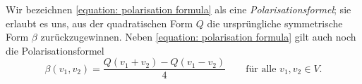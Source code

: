 Wir bezeichnen \eqref{equation: polarisation formula} als eine \emph{Polarisationsformel};
sie erlaubt es uns, aus der quadratischen Form $Q$ die ursprüngliche symmetrische Form $\beta$ zurückzugewinnen.
Neben \eqref{equation: polarisation formula} gilt auch noch die Polarisationsformel
\[
    \beta(v_1, v_2)
  = \frac{Q(v_1 + v _2) - Q(v_1 - v_2)}{4}
  \qquad
  \text{für alle $v_1, v_2 \in V$}.
\]